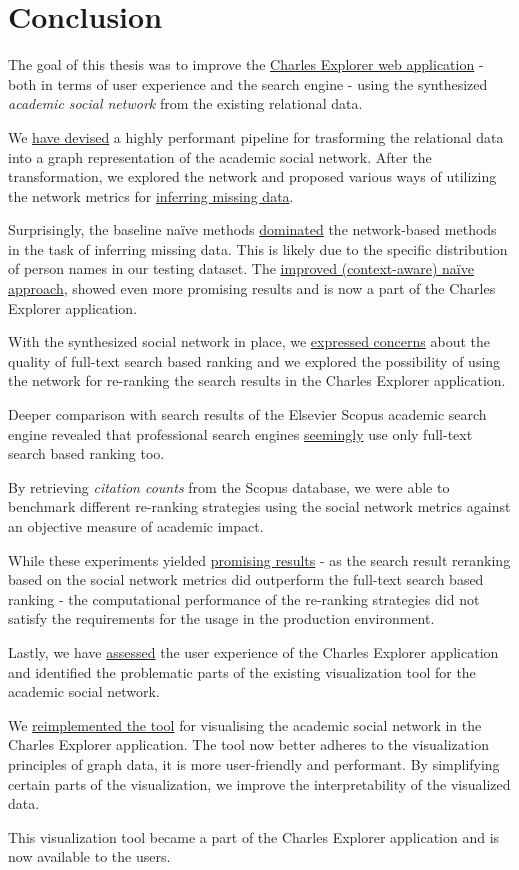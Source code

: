 \chapter*{Conclusion}

The goal of this thesis was to improve the \href{https://explorer.cuni.cz/}{Charles Explorer web application} - both in terms of user experience and the search engine - using the synthesized \textit{academic social network} from the existing relational data.

We \hyperref[sec:target-data-model]{have devised} a highly performant pipeline for trasforming the relational data into a graph representation of the academic social network.
After the transformation, we explored the network and proposed various ways of utilizing the network metrics for \hyperref[sec:inferring-missing-identities]{inferring missing data}.

Surprisingly, the baseline naïve methods \hyperref[fig:hierarchical-f1]{dominated} the network-based methods in the task of inferring missing data.
This is likely due to the specific distribution of person names in our testing dataset.
The \hyperref[sec:on-demand-identity-inference]{improved (context-aware) naïve approach}, showed even more promising results and is now a part of the Charles Explorer application.

With the synthesized social network in place, 
we \hyperref[search-ranking-issues]{expressed concerns} about the quality of full-text search based ranking and we explored the possibility of using the network for re-ranking the search results in the Charles Explorer application.

Deeper comparison with search results of the Elsevier Scopus academic search engine revealed that
professional search engines \hyperref[baseline-benchmark]{seemingly} use only full-text search based ranking too.

By retrieving \textit{citation counts} from the Scopus database, we were able to benchmark different re-ranking strategies using the social network metrics against
an objective measure of academic impact.

While these experiments yielded \hyperref[citation-based-ranking]{promising results} - as the search result reranking based on the social network metrics 
did outperform the full-text search based ranking - the computational performance of the re-ranking strategies did not satisfy the requirements for the usage in the production environment.

Lastly, we have \hyperref[sec:current-state]{assessed} the user experience of the Charles Explorer application 
and identified the problematic parts of the existing visualization tool for the academic social network.

We \hyperref[sec:addressing-issues]{reimplemented the tool} for visualising the academic social network in the Charles Explorer application. 
The tool now better adheres to the visualization principles of graph data, it is more user-friendly and performant.
By simplifying certain parts of the visualization, we improve the interpretability of the visualized data.

This visualization tool became a part of the Charles Explorer application and is now available to the users.
